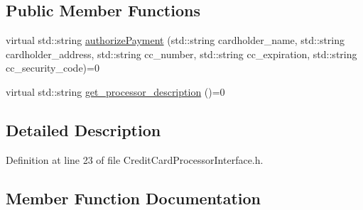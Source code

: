 \subsection*{Public Member Functions}
\begin{DoxyCompactItemize}
\item 
virtual std\+::string \hyperlink{classAsteroids_1_1TechnicalServices_1_1Financial_1_1CreditCardProcessorInterface_a605de1c4a264b4f9ae94ed13dd5fe1c0}{authorize\+Payment} (std\+::string cardholder\+\_\+name, std\+::string cardholder\+\_\+address, std\+::string cc\+\_\+number, std\+::string cc\+\_\+expiration, std\+::string cc\+\_\+security\+\_\+code)=0
\item 
virtual std\+::string \hyperlink{classAsteroids_1_1TechnicalServices_1_1Financial_1_1CreditCardProcessorInterface_a8dcf97d20a9de55d04e0f84b4a788f78}{get\+\_\+processor\+\_\+description} ()=0
\end{DoxyCompactItemize}


\subsection{Detailed Description}


Definition at line 23 of file Credit\+Card\+Processor\+Interface.\+h.



\subsection{Member Function Documentation}
\mbox{\label{classAsteroids_1_1TechnicalServices_1_1Financial_1_1CreditCardProcessorInterface_a605de1c4a264b4f9ae94ed13dd5fe1c0}} 
